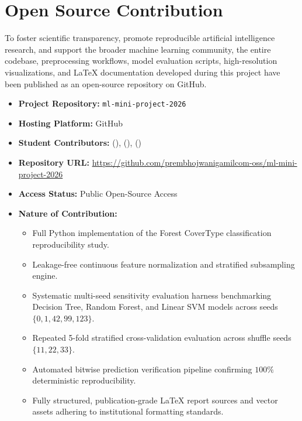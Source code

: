 \clearpage
\section{Open Source Contribution}
\label{sec:open_source_contrib}

To foster scientific transparency, promote reproducible artificial intelligence research, and support the broader machine learning community, the entire codebase, preprocessing workflows, model evaluation scripts, high-resolution visualizations, and LaTeX documentation developed during this project have been published as an open-source repository on GitHub.

\begin{itemize}
    \item \textbf{Project Repository:} \texttt{ml-mini-project-2026}
    \item \textbf{Hosting Platform:} GitHub
    \item \textbf{Student Contributors:} \textbf{\studentone} (\studentoneprn), \textbf{\studenttwo} (\studenttwoprn), \textbf{\studentthree} (\studentthreeprn)
    \item \textbf{Repository URL:} \url{https://github.com/prembhojwanigamilcom-oss/ml-mini-project-2026}
    \item \textbf{Access Status:} Public Open-Source Access
    \item \textbf{Nature of Contribution:}
    \begin{itemize}
        \item Full Python implementation of the Forest CoverType classification reproducibility study.
        \item Leakage-free continuous feature normalization and stratified subsampling engine.
        \item Systematic multi-seed sensitivity evaluation harness benchmarking Decision Tree, Random Forest, and Linear SVM models across seeds $\{0, 1, 42, 99, 123\}$.
        \item Repeated 5-fold stratified cross-validation evaluation across shuffle seeds $\{11, 22, 33\}$.
        \item Automated bitwise prediction verification pipeline confirming $100\%$ deterministic reproducibility.
        \item Fully structured, publication-grade LaTeX report sources and vector assets adhering to institutional formatting standards.
    \end{itemize}
\end{itemize}

